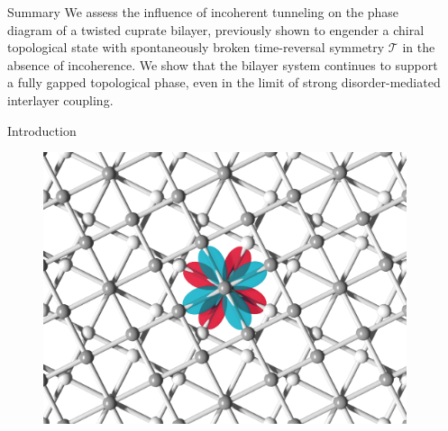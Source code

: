 \documentclass[final]{beamer}
\newlength{\sepwid}
\newlength{\onecolwid}
\begin{document}
\begin{frame}[t] %

\begin{columns}[t] %

\begin{column}{\sepwid}\end{column} %

\begin{column}{\onecolwid} %


\begin{alertblock}{Summary}
We assess the influence of incoherent tunneling on the phase diagram of a
twisted cuprate bilayer, previously shown to engender a chiral topological state
with spontaneously broken time-reversal symmetry $\mathcal{T}$ in the absence of
incoherence. We show that the
bilayer system continues to support a fully gapped topological phase, even in the limit
of strong disorder-mediated interlayer coupling.
\end{alertblock}



\begin{block}{Introduction}

\begin{figure}
	\includegraphics[width=0.7\linewidth]{fig/fig0}
\label{fig:twist}
\end{figure}


\end{block}
\end{column}
\end{columns}
\end{frame}
\end{document}
